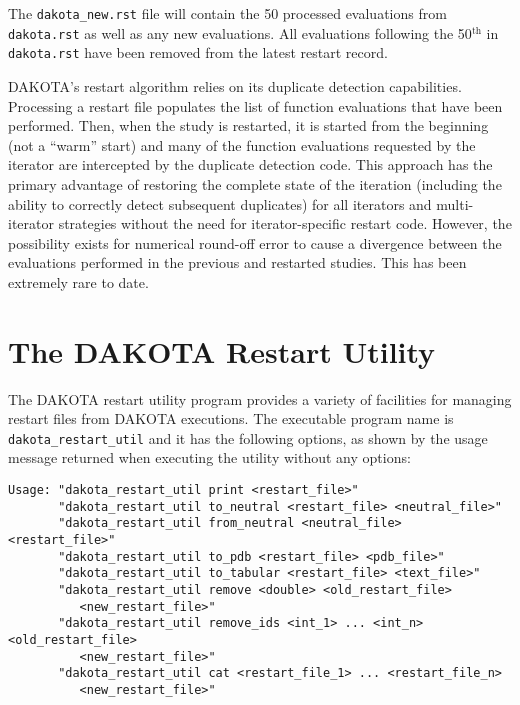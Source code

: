 The \texttt{dakota\_new.rst} file will contain the 50 processed
evaluations from \texttt{dakota.rst} as well as any new evaluations.
All evaluations following the 50$^{\mathrm{th}}$ in \texttt{dakota.rst}
have been removed from the latest restart record.

DAKOTA's restart algorithm relies on its duplicate detection
capabilities. Processing a restart file populates the list of function
evaluations that have been performed. Then, when the study is
restarted, it is started from the beginning (not a ``warm'' start) and
many of the function evaluations requested by the iterator are
intercepted by the duplicate detection code. This approach has the
primary advantage of restoring the complete state of the iteration
(including the ability to correctly detect subsequent duplicates) for
all iterators and multi-iterator strategies without the need for
iterator-specific restart code. However, the possibility exists for
numerical round-off error to cause a divergence between the
evaluations performed in the previous and restarted studies. This has
been extremely rare to date.

\section{The DAKOTA Restart Utility}\label{restart:utility}

The DAKOTA restart utility program provides a variety of facilities
for managing restart files from DAKOTA executions. The executable
program name is \texttt{dakota\_restart\_util} and it has the
following options, as shown by the usage message returned when
executing the utility without any options:
\begin{small}
\begin{verbatim}
Usage: "dakota_restart_util print <restart_file>"
       "dakota_restart_util to_neutral <restart_file> <neutral_file>"
       "dakota_restart_util from_neutral <neutral_file> <restart_file>"
       "dakota_restart_util to_pdb <restart_file> <pdb_file>"
       "dakota_restart_util to_tabular <restart_file> <text_file>"
       "dakota_restart_util remove <double> <old_restart_file>
          <new_restart_file>"
       "dakota_restart_util remove_ids <int_1> ... <int_n> <old_restart_file>
          <new_restart_file>"
       "dakota_restart_util cat <restart_file_1> ... <restart_file_n>
          <new_restart_file>"
\end{verbatim}
\end{small}

